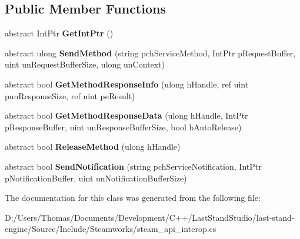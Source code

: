 \subsection*{Public Member Functions}
\begin{DoxyCompactItemize}
\item 
\hypertarget{classValve_1_1Steamworks_1_1ISteamUnifiedMessages_aefd6531fb502e8e0a9423d02853101f5}{}abstract Int\+Ptr {\bfseries Get\+Int\+Ptr} ()\label{classValve_1_1Steamworks_1_1ISteamUnifiedMessages_aefd6531fb502e8e0a9423d02853101f5}

\item 
\hypertarget{classValve_1_1Steamworks_1_1ISteamUnifiedMessages_a347cdc546a7a127f648d3147a0bb39a6}{}abstract ulong {\bfseries Send\+Method} (string pch\+Service\+Method, Int\+Ptr p\+Request\+Buffer, uint un\+Request\+Buffer\+Size, ulong un\+Context)\label{classValve_1_1Steamworks_1_1ISteamUnifiedMessages_a347cdc546a7a127f648d3147a0bb39a6}

\item 
\hypertarget{classValve_1_1Steamworks_1_1ISteamUnifiedMessages_a26a93d25639a4a4eaee3bcdfd1ee3347}{}abstract bool {\bfseries Get\+Method\+Response\+Info} (ulong h\+Handle, ref uint pun\+Response\+Size, ref uint pe\+Result)\label{classValve_1_1Steamworks_1_1ISteamUnifiedMessages_a26a93d25639a4a4eaee3bcdfd1ee3347}

\item 
\hypertarget{classValve_1_1Steamworks_1_1ISteamUnifiedMessages_ae4a93be360f2743d0ff9a8838d8f200d}{}abstract bool {\bfseries Get\+Method\+Response\+Data} (ulong h\+Handle, Int\+Ptr p\+Response\+Buffer, uint un\+Response\+Buffer\+Size, bool b\+Auto\+Release)\label{classValve_1_1Steamworks_1_1ISteamUnifiedMessages_ae4a93be360f2743d0ff9a8838d8f200d}

\item 
\hypertarget{classValve_1_1Steamworks_1_1ISteamUnifiedMessages_ab58034295829ea2c2f144abaa5bbc344}{}abstract bool {\bfseries Release\+Method} (ulong h\+Handle)\label{classValve_1_1Steamworks_1_1ISteamUnifiedMessages_ab58034295829ea2c2f144abaa5bbc344}

\item 
\hypertarget{classValve_1_1Steamworks_1_1ISteamUnifiedMessages_a983bfdf71cac667e1b0cee3f8e5e0829}{}abstract bool {\bfseries Send\+Notification} (string pch\+Service\+Notification, Int\+Ptr p\+Notification\+Buffer, uint un\+Notification\+Buffer\+Size)\label{classValve_1_1Steamworks_1_1ISteamUnifiedMessages_a983bfdf71cac667e1b0cee3f8e5e0829}

\end{DoxyCompactItemize}


The documentation for this class was generated from the following file\+:\begin{DoxyCompactItemize}
\item 
D\+:/\+Users/\+Thomas/\+Documents/\+Development/\+C++/\+Last\+Stand\+Studio/last-\/stand-\/engine/\+Source/\+Include/\+Steamworks/steam\+\_\+api\+\_\+interop.\+cs\end{DoxyCompactItemize}
